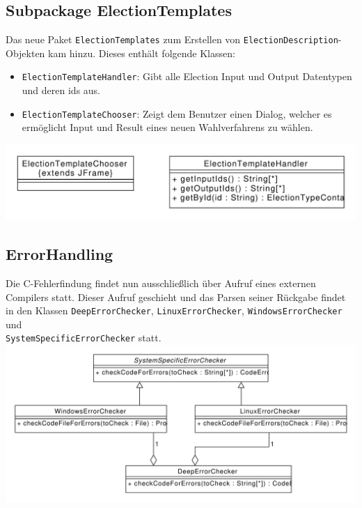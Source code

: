 \documentclass[a4paper]{scrreprt}
\begin{document}
\subsection{Subpackage ElectionTemplates}
Das neue Paket \verb!ElectionTemplates! zum Erstellen von \verb!ElectionDescription!-Objekten kam hinzu. Dieses enthält folgende Klassen:
\begin{itemize}
\item \verb!ElectionTemplateHandler!: Gibt alle Election Input und Output Datentypen und deren ids aus.
\item \verb!ElectionTemplateChooser!: Zeigt dem Benutzer einen Dialog, welcher es ermöglicht Input und Result eines neuen Wahlverfahrens zu wählen.
\end{itemize}
\includegraphics[scale=0.5]{ElectionTemplates.pdf}\\

\subsection{ErrorHandling}
Die C-Fehlerfindung findet nun ausschließlich über Aufruf eines externen Compilers statt. Dieser Aufruf geschieht und das Parsen seiner Rückgabe findet in den Klassen \verb!DeepErrorChecker!, \verb!LinuxErrorChecker!, \verb!WindowsErrorChecker! und \\ \verb!SystemSpecificErrorChecker! statt.\\
\includegraphics[scale=0.5]{CErrorChecking.pdf}
\end{document}
